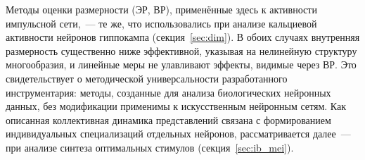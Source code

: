 Методы оценки размерности (ЭР, ВР), применённые здесь к активности импульсной сети,~--- те же, что использовались при анализе кальциевой активности нейронов гиппокампа (секция~\ref{sec:dim}). В обоих случаях внутренняя размерность существенно ниже эффективной, указывая на нелинейную структуру многообразия, и линейные меры не улавливают эффекты, видимые через ВР. Это свидетельствует о методической универсальности разработанного инструментария: методы, созданные для анализа биологических нейронных данных, без модификации применимы к искусственным нейронным сетям. Как описанная коллективная динамика представлений связана с формированием индивидуальных специализаций отдельных нейронов, рассматривается далее~--- при анализе синтеза оптимальных стимулов (секция~\ref{sec:ib_mei}).
